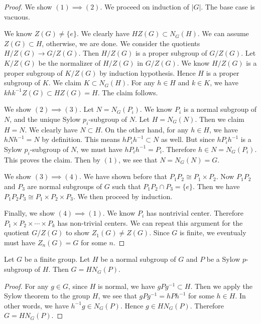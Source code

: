 \begin{proof}
    We show $(1) \implies (2)$. We proceed on induction of $|G|$. The base case is vacuous.

    We know $Z(G) \neq \{e \}$. We clearly have $H Z(G) \subset N_G(H)$. We can assume $Z(G) \subset H$, otherwise, we are done. We consider the quotients $H / Z(G) \rightarrow G /Z(G)$. Then $H/ Z(G)$ is a proper subgroup of $G /Z(G)$. Let $K / Z(G)$ be the normalizer of $H/ Z(G)$ in $G /Z(G)$. We know $H/ Z(G)$ is a proper subgroup of $K / Z(G)$ by induction hypothesis. Hence $H$ is a proper subgroup of $K$. We claim $K \subset  N_G(H)$. For any $ h \in H$ and $k \in K$, we have $k h k^{-1} Z(G) \subset HZ(G) = H$. The claim follows.

    We show $(2) \implies (3)$. Let $N = N_G(P_i)$. We know $P_i$ is a normal subgroup of $N$, and the unique Sylow $p_i$-subgroup of $N$. Let $H = N_G(N)$. Then we claim $H = N$. We clearly have $N \subset H$. On the other hand, for any $h \in H$, we have $hNh^{-1} = N$ by definition. This means $hP_ih^{-1} \subset N$ as well. But since $ hP_ih^{-1}$ is a Sylow $p_i$-subgroup of $N$, we must have $ hP_ih^{-1} = P_i$. Therefore $h \in N = N_G(P_i)$.  This proves the claim. Then by $(1)$, we see that $N = N_G(N) = G$.

    We show $(3) \implies (4)$. We have shown before that $P_1P_2 \cong P_1 \times P_2$. Now $P_1P_2$ and $P_3$ are  normal subgroups of $G$ such that $P_1P_2 \cap P_3 = \{e\}$. Then we have $P_1P_2P_3 \cong P_1 \times P_2 \times P_3$. We then proceed by induction.

    Finally, we show $(4) \implies (1)$. We know $P_i$ has nontrivial center. Therefore $P_1 \times P_2 \times \cdots \times P_k$ has non-trivial centers. We can repeat this argument for the quotient $G/Z(G)$ to show $Z_1 (G) \neq Z(G)$. Since $G$ is finite, we eventualy must have $Z_n(G) = G$ for some $n$.
\end{proof}


\begin{prop}
    Let $G$ be a finite group. Let $H$ be a normal subgroup of $G$ and $P$ be a Sylow $p$-subgroup of $H$. Then $G = H N_G(P)$.
\end{prop}

\begin{proof}
    For any $g \in G$, since $H$ is normal, we have $g P g^{-1} \subset H$. Then we apply the Sylow theorem to the group $H$, we see that $g P g^{-1} = h P h^{-1}$ for some $h \in H$. In other words, we have $h^{-1}g \in N_G(P)$. Hence $g \in HN_G(P)$. Therefore $G=HN_G(P)$.
\end{proof}

